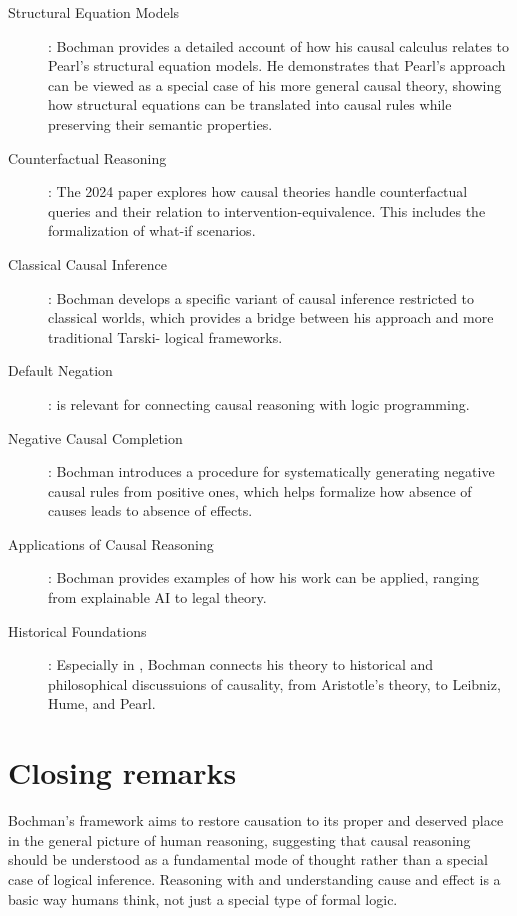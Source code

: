 \documentclass[seminar,palatino,english]{AIGpaper}
\begin{document}
\begin{description}
    \item [Structural Equation Models]: Bochman provides a detailed account of how his causal calculus relates to Pearl's structural equation models. He demonstrates that Pearl's approach can be viewed as a special case of his more general causal theory, showing how structural equations can be translated into causal rules while preserving their semantic properties.
    
    \item [Counterfactual Reasoning]: The 2024 paper explores how causal theories handle counterfactual queries and their relation to intervention-equivalence. This includes the formalization of \glqq{}what-if\grqq{} scenarios.
    
    \item [Classical Causal Inference]: Bochman develops a specific variant of causal inference restricted to classical worlds, which provides a bridge between his approach and more traditional \glqq{}Tarski-\grqq{} logical frameworks.
    
    \item [Default Negation]: is relevant for connecting causal reasoning with logic programming.
    
    \item [Negative Causal Completion]: Bochman introduces a procedure for systematically generating negative causal rules from positive ones, which helps formalize how absence of causes leads to absence of effects.
    
    \item [Applications of Causal Reasoning]: Bochman provides examples of how his work can be applied, ranging from explainable AI to legal theory.
    
    \item [Historical Foundations]: Especially in \cite{bochman_logical_2021}, Bochman connects his theory to historical and philosophical discussuions of causality, from Aristotle's theory, to Leibniz, Hume, and Pearl.
\end{description}

\section{Closing remarks}

Bochman's framework aims to restore causation to \glqq{}its proper and deserved place in the general picture of human reasoning\grqq{}\cite{bochman_causal_2024}, suggesting that causal reasoning should be understood as a fundamental mode of thought rather than a special case of logical inference. Reasoning with and understanding cause and effect is a basic way humans think, not just a special type of formal logic. 
\end{document}
